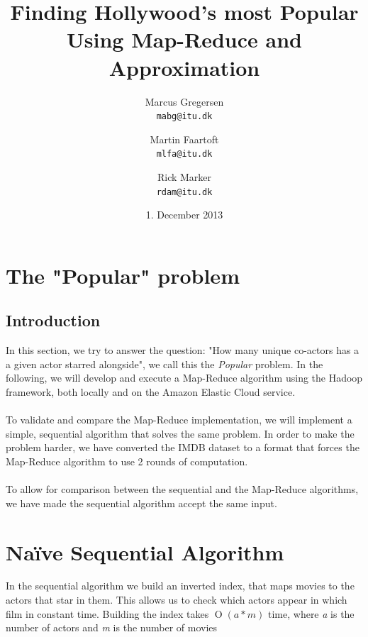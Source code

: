 \documentclass[a4paper,11pt]{article}
\newcommand{\BigO}[1]{\ensuremath{\operatorname{O}\left(#1\right)}}
\begin{document}
\date{1. December 2013}
\title{Finding Hollywood's most Popular\\Using Map-Reduce and Approximation}

\author{Marcus Gregersen\\
\texttt{mabg@itu.dk} 
\and Martin Faartoft\\
\texttt{mlfa@itu.dk}
\and Rick Marker\\
\texttt{rdam@itu.dk}}

\clearpage\maketitle
\thispagestyle{empty}
\setcounter{page}{1}
\section{The "Popular" problem}
\subsection{Introduction}
In this section, we try to answer the question: "How many unique co-actors has a a given actor starred alongside", we call this the \emph{Popular} problem. In the following, we will develop and execute a Map-Reduce algorithm using the Hadoop framework, both locally and on the Amazon Elastic Cloud service.
\paragraph{}
To validate and compare the Map-Reduce implementation, we will implement a simple, sequential algorithm that solves the same problem. In order to make the problem harder, we have converted the IMDB dataset to a format that forces the Map-Reduce algorithm to use 2 rounds of computation.
\paragraph{} 
To allow for comparison between the sequential and the Map-Reduce algorithms, we have made the sequential algorithm accept the same input.
\section{Naïve Sequential Algorithm}
\label{sub:sequential}
In the sequential algorithm we build an inverted index, that maps movies to the actors that star in them. This allows us to check which actors appear in which film in constant time. Building the index takes \BigO{a*m} time, where \emph{a} is the number of actors and \emph{m} is the number of movies\\
\end{document}
